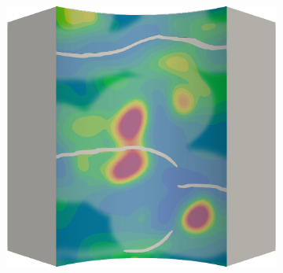 \begin{frame}
\begin{columns}[T]
\begin{column}{0.6\textwidth}
\begin{figure}
{\begin{subfigure}{0.19\textwidth}
          \end{subfigure}
          \hspace{0.06\textwidth}
          \begin{subfigure}{0.19\textwidth}
            \centering
            \includegraphics[width=\textwidth]{examples/figures/ep.0030}
          \end{subfigure}
        }
        

\end{figure}
\end{column}
\end{columns}
\end{frame}
